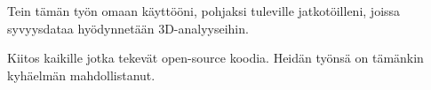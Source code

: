 Tein tämän työn omaan käyttööni, pohjaksi tuleville jatkotöilleni, joissa syvyysdataa hyödynnetään 3D-analyyseihin.  

Kiitos kaikille jotka tekevät open-source koodia. Heidän työnsä on tämänkin kyhäelmän mahdollistanut.
